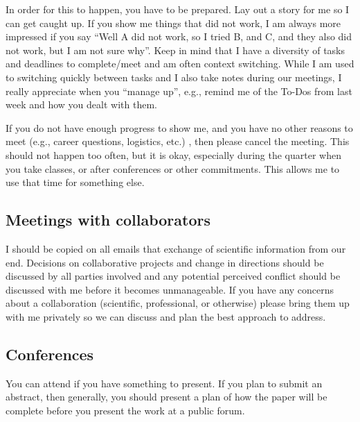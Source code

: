 \documentclass[12pt]{article}
\begin{document}
In order for this to happen, you have to be prepared.
Lay out a story for me so I can get caught up.
If you show me things that did not work, I am always more impressed if you say ``Well A did not work, so I tried B, and C, and they also did not work, but I am not sure why''.
Keep in mind that I have a diversity of tasks and deadlines to complete/meet and am often context switching.
While I am used to switching quickly between tasks and I also take notes during our meetings, I really appreciate when you ``manage up'', e.g., remind me of the To-Dos from last week and how you dealt with them.

If you do not have enough progress to show me, and you have no other reasons to meet (e.g., career questions, logistics, etc.)
, then please cancel the meeting.
This should not happen too often, but it is okay, especially during the quarter when you take classes, or after conferences or other commitments.
This allows me to use that time for something else.

\subsection{Meetings with collaborators}

I should be copied on all emails that exchange of scientific information from our end.
Decisions on collaborative projects and change in directions should be discussed by all parties involved and any potential perceived conflict should be discussed with me before it becomes unmanageable.
If you have any concerns about a collaboration (scientific, professional, or otherwise) please bring them up with me privately so we can discuss and plan the best approach to address.

\subsection{Conferences}

You can attend if you have something to present.
If you plan to submit an abstract, then generally, you should present a plan of how the paper will be complete before you present the work at a public forum.
\end{document}
